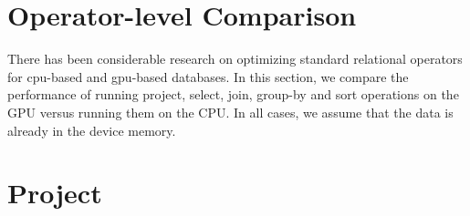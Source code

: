 \section{Operator-level Comparison}

There has been considerable research on optimizing standard relational operators
for cpu-based and gpu-based databases. In this section, we compare the 
performance of running project, select, join, group-by and sort operations on the 
GPU versus running them on the CPU. In all cases, we assume that the data is
already in the device memory.

\section{Project}



